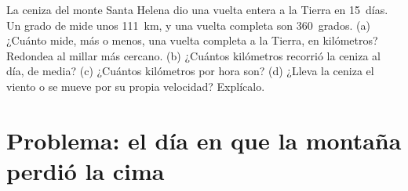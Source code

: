 \begin{exercise}[$\star\star\star$]\label{exo:g7:volcanoes:12}
La ceniza del monte Santa Helena dio una vuelta entera a la Tierra en
15~días. Un grado de  mide unos \qty{111}{km}, y una vuelta completa
son 360~grados. (a) ¿Cuánto mide, más o menos, una vuelta completa a la
Tierra, en kilómetros? Redondea al millar más cercano. (b) ¿Cuántos
kilómetros recorrió la ceniza al día, de media? (c) ¿Cuántos kilómetros por
hora son? (d) ¿Lleva la ceniza el viento o se mueve por su propia
velocidad? Explícalo.
\end{exercise}

\section{Problema: el día en que la montaña perdió la cima}

